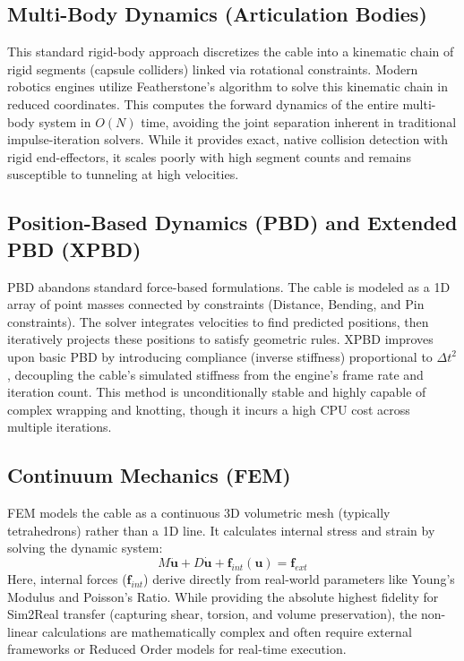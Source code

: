 \documentclass[a4paper,12pt]{report}
\begin{document}
\subsection{Multi-Body Dynamics (Articulation Bodies)}
This standard rigid-body approach discretizes the cable into a kinematic chain of rigid segments (capsule colliders) linked via rotational constraints. Modern robotics engines utilize Featherstone's algorithm to solve this kinematic chain in reduced coordinates. This computes the forward dynamics of the entire multi-body system in $O(N)$ time, avoiding the joint separation inherent in traditional impulse-iteration solvers. While it provides exact, native collision detection with rigid end-effectors, it scales poorly with high segment counts and remains susceptible to tunneling at high velocities.

\subsection{Position-Based Dynamics (PBD) and Extended PBD (XPBD)}
PBD abandons standard force-based formulations. The cable is modeled as a 1D array of point masses connected by constraints (Distance, Bending, and Pin constraints). The solver integrates velocities to find predicted positions, then iteratively projects these positions to satisfy geometric rules. XPBD improves upon basic PBD by introducing compliance (inverse stiffness) proportional to $\Delta t^2$, decoupling the cable's simulated stiffness from the engine's frame rate and iteration count. This method is unconditionally stable and highly capable of complex wrapping and knotting, though it incurs a high CPU cost across multiple iterations.

\subsection{Continuum Mechanics (FEM)}
FEM models the cable as a continuous 3D volumetric mesh (typically tetrahedrons) rather than a 1D line. It calculates internal stress and strain by solving the dynamic system:
$$M\ddot{\mathbf{u}}+D\dot{\mathbf{u}}+\mathbf{f}_{int}(\mathbf{u})=\mathbf{f}_{ext}$$
Here, internal forces ($\mathbf{f}_{int}$) derive directly from real-world parameters like Young's Modulus and Poisson's Ratio. While providing the absolute highest fidelity for Sim2Real transfer (capturing shear, torsion, and volume preservation), the non-linear calculations are mathematically complex and often require external frameworks or Reduced Order models for real-time execution.
\end{document}
